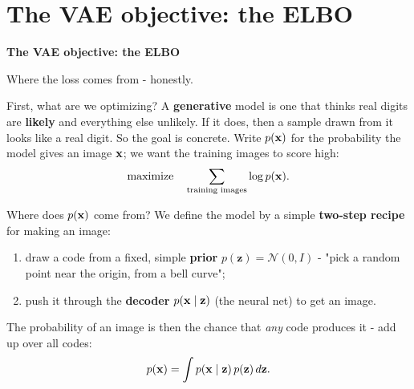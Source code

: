 \documentclass[aspectratio=169]{beamer}
\begin{document}
\section{The VAE objective: the ELBO}

\begin{frame}[plain]
  \vfill
  \begin{center}
    {\Large\color{popblue}\textbf{The VAE objective: the ELBO}}\\[0.9em]
    \begin{minipage}{0.82\textwidth}\centering\small
      Where the loss comes from - honestly.
    \end{minipage}
  \end{center}
  \vfill
\end{frame}

\begin{frame}{First, what are we optimizing?}
  \small
  A \textbf{generative} model is one that thinks real digits are \textbf{likely} and everything
  else unlikely. If it does, then a sample drawn from it looks like a real digit.
  \vskip 4pt
  So the goal is concrete. Write $p(\mathbf{x})$ for the probability the model gives an image $\mathbf{x}$; we
  want the training images to score high:
  \[
    \text{maximize} \quad \sum_{\text{training images}} \log p(\mathbf{x}).
  \]
\end{frame}

\begin{frame}{Where does $p(\mathbf{x})$ come from?}
  \small
  We define the model by a simple \textbf{two-step recipe} for making an image:
  \vskip 2pt
  \begin{enumerate}
    \item draw a code from a fixed, simple \textbf{prior} $p(\mathbf{z})=\mathcal{N}(0,I)$ - "pick a
      random point near the origin, from a bell curve";
    \item push it through the \textbf{decoder} $p(\mathbf{x}\mid\mathbf{z})$ (the neural net) to get an image.
  \end{enumerate}
  \vskip 2pt
  The probability of an image is then the chance that \emph{any} code produces it - add up over all codes:
  \[
    p(\mathbf{x}) = \int p(\mathbf{x} \mid \mathbf{z})\, p(\mathbf{z})\, d\mathbf{z}.
  \]
\end{frame}
\end{document}
